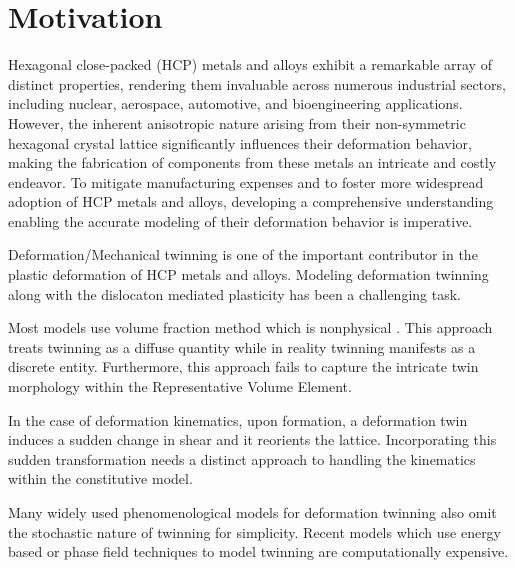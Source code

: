 \section{Motivation}
Hexagonal close-packed (HCP) metals and alloys exhibit a remarkable array of distinct properties, rendering them invaluable across numerous industrial sectors, including nuclear, aerospace, automotive, and bioengineering applications. However, the inherent anisotropic nature arising from their non-symmetric hexagonal crystal lattice significantly influences their deformation behavior, making the fabrication of components from these metals an intricate and costly endeavor. To mitigate manufacturing expenses and to foster more widespread adoption of HCP metals and alloys, developing a comprehensive understanding enabling the accurate modeling of their deformation behavior is imperative.

\vspace{3mm}
Deformation/Mechanical twinning is one of the important contributor in the plastic deformation of HCP metals and alloys. Modeling deformation twinning along with the dislocaton mediated plasticity has been a challenging task. 

\vspace{3mm}
Most models use volume fraction method which is nonphysical \cite{Paduel202111091373}. This approach treats twinning as a diffuse quantity while in reality twinning manifests as a discrete entity. Furthermore, this approach fails to capture the intricate twin morphology within the Representative Volume Element. 

\vspace{3mm}
In the case of deformation kinematics, upon formation, a deformation twin induces a sudden change in shear and it reorients the lattice. Incorporating this sudden transformation needs a distinct approach to handling the kinematics within the constitutive model.

\vspace{3mm}
Many widely used phenomenological models\cite{KALIDINDI1998267} for deformation twinning also omit the stochastic nature of twinning for simplicity. Recent models which use energy based or phase field techniques to model twinning are computationally expensive.

